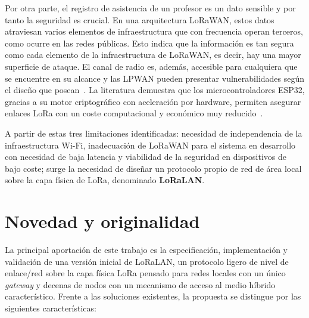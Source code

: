 Por otra parte, el registro de asistencia de un profesor es un dato sensible y por tanto la seguridad es crucial. En una arquitectura LoRaWAN, estos datos atraviesan varios elementos de infraestructura que con frecuencia operan terceros, como ocurre en las redes públicas. Esto indica que la información es tan segura como cada elemento de la infraestructura de LoRaWAN, es decir, hay una mayor superficie de ataque. El canal de radio es, además, accesible para cualquiera que se encuentre en su alcance y las LPWAN pueden presentar vulnerabilidades según el diseño que posean~\cite{chacko2018security}. La literatura demuestra que los microcontroladores ESP32, gracias a su motor criptográfico con aceleración por hardware, permiten asegurar enlaces LoRa con un coste computacional y económico muy reducido~\cite{iqbal2018aes,babiuch2019esp32}.

A partir de estas tres limitaciones identificadas: necesidad de independencia de la infraestructura Wi-Fi, inadecuación de LoRaWAN para el sistema en desarrollo con necesidad de baja latencia y viabilidad de la seguridad en dispositivos de bajo coste; surge la necesidad de diseñar un protocolo propio de red de área local sobre la capa física de LoRa, denominado \textbf{LoRaLAN}.

\section{Novedad y originalidad}

La principal aportación de este trabajo es la especificación, implementación y validación de una versión inicial de LoRaLAN, un protocolo ligero de nivel de enlace/red sobre la capa física LoRa pensado para redes locales con un único \textit{gateway} y decenas de nodos con un mecanismo de acceso al medio híbrido característico. Frente a las soluciones existentes, la propuesta se distingue por las siguientes características:

